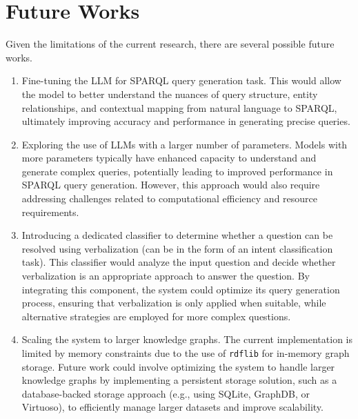 \section{Future Works}
Given the limitations of the current research, there are several possible future works.
\begin{enumerate}
    \item Fine-tuning the LLM for SPARQL query generation task. This would allow the model to better understand the nuances of query structure, entity relationships, and contextual mapping from natural language to SPARQL, ultimately improving accuracy and performance in generating precise queries.
    \item Exploring the use of LLMs with a larger number of parameters. Models with more parameters typically have enhanced capacity to understand and generate complex queries, potentially leading to improved performance in SPARQL query generation. However, this approach would also require addressing challenges related to computational efficiency and resource requirements.
    \item Introducing a dedicated classifier to determine whether a question can be resolved using verbalization (can be in the form of an intent classification task). This classifier would analyze the input question and decide whether verbalization is an appropriate approach to answer the question. By integrating this component, the system could optimize its query generation process, ensuring that verbalization is only applied when suitable, while alternative strategies are employed for more complex questions.
    \item Scaling the system to larger knowledge graphs. The current implementation is limited by memory constraints due to the use of \texttt{rdflib} for in-memory graph storage. Future work could involve optimizing the system to handle larger knowledge graphs by implementing a persistent storage solution, such as a database-backed storage approach (e.g., using SQLite, GraphDB, or Virtuoso), to efficiently manage larger datasets and improve scalability.
\end{enumerate}